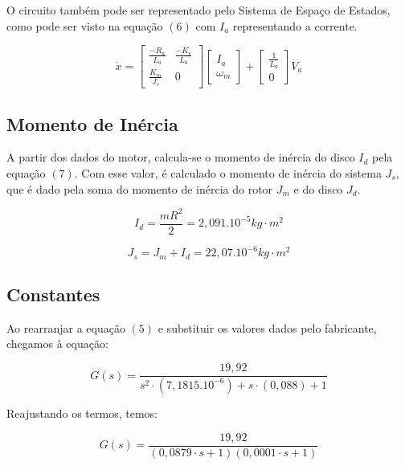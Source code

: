 \documentclass[12pt]{article}
\begin{document}
\quad O circuito também pode ser representado pelo Sistema de Espaço de Estados, como pode ser visto na equação $(6)$ com $I_a$ representando a corrente.

\begin{equation}
    \dot{x} = 
    \begin{bmatrix} 
        \frac{-R_a}{L_a} & \frac{-K_e}{L_a} \\
        \frac{K_m}{J_s} & 0
    \end{bmatrix}
    \begin{bmatrix}
        I_a\\
        \omega_m
    \end{bmatrix}
    +
    \begin{bmatrix}
        \frac{1}{L_a}\\
        0
    \end{bmatrix}V_a
\end{equation}

\subsection{Momento de Inércia}

\quad A partir dos dados do motor, calcula-se o momento de inércia do disco $I_d$ pela equação $(7)$. Com esse valor, é calculado o momento de inércia do sistema $J_s$, que é dado pela soma do momento de inércia do rotor $J_m$ e do disco $J_d$.

\begin{equation}
    I_d = \frac{mR^2}{2} = 2,091.10^{-5} kg\cdot m^2
\end{equation}

\begin{equation}
    J_s = J_m + I_d = 22,07.10^{-6} kg\cdot m^2
\end{equation}

\subsection{Constantes}

\quad Ao rearranjar a equação $(5)$ e substituir os valores dados pelo fabricante, chegamos à equação:

\begin{equation}
    G(s) = \frac{19,92}{s^2 \cdot (7,1815.10^{-6}) + s\cdot (0,088) + 1} 
\end{equation}

\quad Reajustando os termos, temos:

\begin{equation}
    G(s) = \frac{19,92}{(0,0879\cdot s + 1)(0,0001 \cdot s + 1)}
\end{equation}
\end{document}
